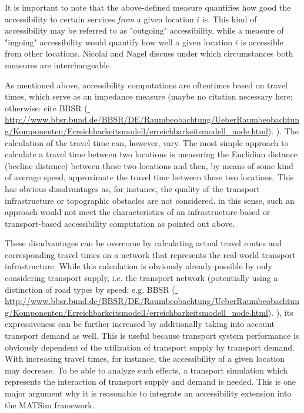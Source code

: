It is important to note that the above-defined measure quantifies how good the accessibility to certain services \textit{from} a given location $i$ is. This kind of accessibility may be referred to as "outgoing" accessibility, while a measure of "ingoing" accessibility would quantify how well a given location $i$ is accessible from other locations. Nicolai and Nagel \citet{NicolaiNagel2012HiResAccessibilityMethodInBook} discuss under which circumstances both measures are interchangeable.

As mentioned above, accessibility computations are oftentimes based on travel times, which serve as an impedance measure (maybe no citation necessary here; otherwise: cite BBSR (\url{	http://www.bbsr.bund.de/BBSR/DE/Raumbeobachtung/UeberRaumbeobachtung/Komponenten/Erreichbarkeitsmodell/erreichbarkeitsmodell_node.html}). ). The calculation of the travel time can, however, vary. The most simple approach to calculate a travel time between two locations is measuring the Euclidian distance (beeline distance) between these two locations and then, by means of some kind of average speed, approximate the travel time between these two locations. This has obvious disadvantages as, for instance, the quality of the transport infrastructure or topographic obstacles are not considered. in this sense, such an approach would not meet the characteristics of an {in\-fra\-struc\-ture-based} or transport-based accessibility computation as pointed out above.

These disadvantages can be overcome by calculating actual travel routes and corresponding travel times on a network that represents the real-world transport infrastructure. While this calculation is obviously already possible by only considering transport supply, i.e. the transport network (potentially using a distinction of road types by speed; e.g. BBSR (\url{	http://www.bbsr.bund.de/BBSR/DE/Raumbeobachtung/UeberRaumbeobachtung/Komponenten/Erreichbarkeitsmodell/erreichbarkeitsmodell_node.html}). ), its expressiveness can be further increased by additionally taking into account transport demand as well. This is useful because transport system performance is obviously dependent of the utilization of transport supply by transport demand. With increasing travel times, for instance, the accessibility of a given location may decrease. To be able to analyze such effects, a transport simulation which represents the interaction of transport supply and demand is needed. This is one major argument why it is reasonable to integrate an accessibility extension into the MATSim framework.

